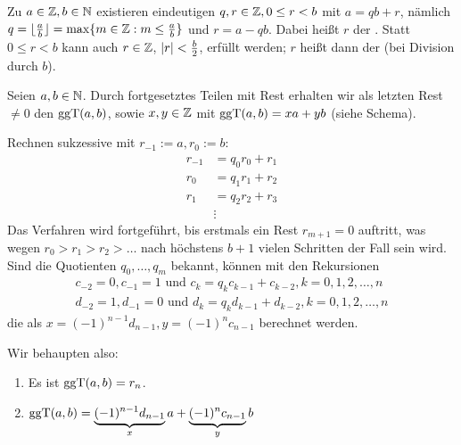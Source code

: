 \begin{satz}
	Zu $a \in \mathbb{Z}, b \in \mathbb{N}$ existieren eindeutigen $q,r \in \mathbb{Z}, 0 \leq r < b$ mit $a = qb + r$, nämlich $q = \Floor{\frac{a}{b}} = \max\{m \in \ZZ : \linebreak m \leq \frac{a}{b}\}$ und $r = a-qb$. 
	Dabei heißt $r$ der . 
	Statt $0 \leq r < b$ kann auch $r \in \mathbb{Z}$, $\left\lvert r\right\rvert < \frac{b}{2}$, erfüllt werden; $r$ heißt dann der  (bei Division durch $b$). 
	  
\end{satz}

\begin{satz}
\label{satz_ea}
	Seien $a,b \in \mathbb{N}$. 
	Durch fortgesetztes Teilen mit Rest erhalten wir als letzten Rest $\neq 0$ den $\operatorname{ggT}(a,b)$, sowie $x,y \in \mathbb{Z}$ mit $\operatorname{ggT}(a,b) = xa + yb$ (siehe Schema). 
\end{satz}

	Rechnen sukzessive mit $r_{-1} := a, r_0 :=b$:
	\begin{equation}
	\begin{aligned}
		r_{-1} &= q_0 r_0 + r_1 \\
		r_0 &= q_1 r_1 + r_2 \\
		r_1 &= q_2 r_2 + r_3 \\
		&\vdots
	\end{aligned}
	\end{equation}
	Das Verfahren wird fortgeführt, bis erstmals ein Rest $r_{m+1} = 0$ auftritt, was wegen $r_0 > r_1 > r_2 > \dots$ nach höchstens $b + 1$ vielen Schritten der Fall sein wird. 
	Sind die Quotienten $q_0, \dots, q_m$ bekannt, können mit den Rekursionen
	\[
	\begin{array}{c}
		c_{-2} = 0, c_{-1} = 1 \text{ und } c_k = q_k c_{k-1} + c_{k-2}, k=0,1,2, \dots, n \\
		d_{-2} = 1, d_{-1} = 0 \text{ und } d_k = q_k d_{k-1} + d_{k-2}, k=0,1,2, \dots, n
	\end{array}
	\]
	die  als $x = (-1)^{n-1} d_{n-1}, y=(-1)^n c_{n-1}$ berechnet werden.
	
	Wir behaupten also: \begin{enumerate}[(1)]
		\item Es ist $\operatorname{ggT}(a,b) = r_n$.
		\item $\operatorname{ggT}(a,b) = \underbrace{(-1)^{n-1} d_{n-1}}_{x} a + \underbrace{(-1)^n c_{n-1}}_{y} b$
	\end{enumerate}

